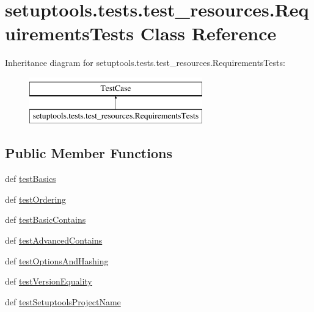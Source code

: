 \hypertarget{classsetuptools_1_1tests_1_1test__resources_1_1RequirementsTests}{}\section{setuptools.\+tests.\+test\+\_\+resources.\+Requirements\+Tests Class Reference}
\label{classsetuptools_1_1tests_1_1test__resources_1_1RequirementsTests}
Inheritance diagram for setuptools.\+tests.\+test\+\_\+resources.\+Requirements\+Tests\+:\begin{figure}[H]
\begin{center}
\leavevmode
\includegraphics[height=2.000000cm]{classsetuptools_1_1tests_1_1test__resources_1_1RequirementsTests}
\end{center}
\end{figure}
\subsection*{Public Member Functions}
\begin{DoxyCompactItemize}
\item 
def \hyperlink{classsetuptools_1_1tests_1_1test__resources_1_1RequirementsTests_a54226b7febcc497feb527e0b76720d01}{test\+Basics}
\item 
def \hyperlink{classsetuptools_1_1tests_1_1test__resources_1_1RequirementsTests_a3afd064dfd4ea8612dc8b3a555c697d4}{test\+Ordering}
\item 
def \hyperlink{classsetuptools_1_1tests_1_1test__resources_1_1RequirementsTests_a12cfeeeb9d480cf7f7adb56e098d224b}{test\+Basic\+Contains}
\item 
def \hyperlink{classsetuptools_1_1tests_1_1test__resources_1_1RequirementsTests_a8905c69de1dbb0af570ab03dd371ff66}{test\+Advanced\+Contains}
\item 
def \hyperlink{classsetuptools_1_1tests_1_1test__resources_1_1RequirementsTests_a2fcacffbf7a794aa20c876176883a43a}{test\+Options\+And\+Hashing}
\item 
def \hyperlink{classsetuptools_1_1tests_1_1test__resources_1_1RequirementsTests_a4df79788e3393797d2b8ac79e83a018a}{test\+Version\+Equality}
\item 
def \hyperlink{classsetuptools_1_1tests_1_1test__resources_1_1RequirementsTests_a36addb72ff4880b9c3d5fbc175c33e0b}{test\+Setuptools\+Project\+Name}
\end{DoxyCompactItemize}


